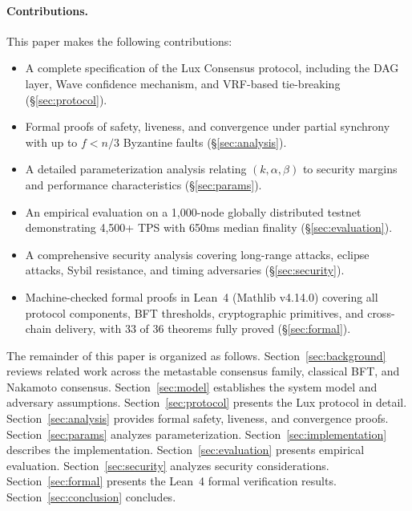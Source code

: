 \documentclass[11pt,a4paper]{article}
\begin{document}
\paragraph{Contributions.}
This paper makes the following contributions:
\begin{itemize}[nosep]
\item A complete specification of the Lux Consensus protocol, including the DAG layer,
Wave confidence mechanism, and VRF-based tie-breaking (\S\ref{sec:protocol}).
\item Formal proofs of safety, liveness, and convergence under partial synchrony with
up to $f < n/3$ Byzantine faults (\S\ref{sec:analysis}).
\item A detailed parameterization analysis relating $(k, \alpha, \beta)$ to security
margins and performance characteristics (\S\ref{sec:params}).
\item An empirical evaluation on a 1,000-node globally distributed testnet demonstrating
4,500+ TPS with 650ms median finality (\S\ref{sec:evaluation}).
\item A comprehensive security analysis covering long-range attacks, eclipse attacks,
Sybil resistance, and timing adversaries (\S\ref{sec:security}).
\item Machine-checked formal proofs in Lean~4 (Mathlib v4.14.0) covering all protocol
components, BFT thresholds, cryptographic primitives, and cross-chain delivery,
with 33 of 36 theorems fully proved (\S\ref{sec:formal}).
\end{itemize}

The remainder of this paper is organized as follows. Section~\ref{sec:background} reviews
related work across the metastable consensus family, classical BFT, and Nakamoto consensus.
Section~\ref{sec:model} establishes the system model and adversary assumptions.
Section~\ref{sec:protocol} presents the Lux protocol in detail.
Section~\ref{sec:analysis} provides formal safety, liveness, and convergence proofs.
Section~\ref{sec:params} analyzes parameterization.
Section~\ref{sec:implementation} describes the implementation.
Section~\ref{sec:evaluation} presents empirical evaluation.
Section~\ref{sec:security} analyzes security considerations.
Section~\ref{sec:formal} presents the Lean~4 formal verification results.
Section~\ref{sec:conclusion} concludes.

\end{document}
